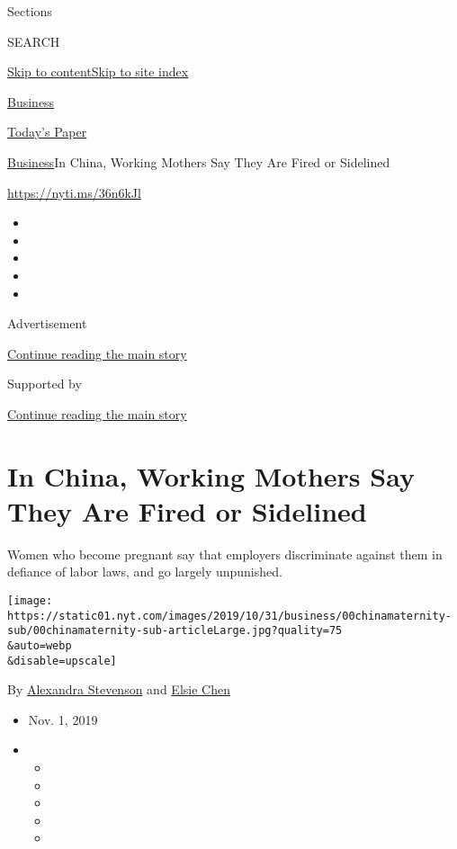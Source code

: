 Sections

SEARCH

\protect\hyperlink{site-content}{Skip to
content}\protect\hyperlink{site-index}{Skip to site index}

\href{https://www.nytimes.com/section/business}{Business}

\href{https://myaccount.nytimes.com/auth/login?response_type=cookie\&client_id=vi}{}

\href{https://www.nytimes.com/section/todayspaper}{Today's Paper}

\href{/section/business}{Business}\textbar{}In China, Working Mothers
Say They Are Fired or Sidelined

\url{https://nyti.ms/36n6kJl}

\begin{itemize}
\item
\item
\item
\item
\item
\end{itemize}

Advertisement

\protect\hyperlink{after-top}{Continue reading the main story}

Supported by

\protect\hyperlink{after-sponsor}{Continue reading the main story}

\hypertarget{in-china-working-mothers-say-they-are-fired-or-sidelined}{%
\section{In China, Working Mothers Say They Are Fired or
Sidelined}\label{in-china-working-mothers-say-they-are-fired-or-sidelined}}

Women who become pregnant say that employers discriminate against them
in defiance of labor laws, and go largely unpunished.

\texttt{[image: https://static01.nyt.com/images/2019/10/31/business/00chinamaternity-sub/00chinamaternity-sub-articleLarge.jpg?quality=75\\\&auto=webp\\\&disable=upscale]}

By \href{https://www.nytimes.com/by/alexandra-stevenson}{Alexandra
Stevenson} and \href{https://www.nytimes.com/by/elsie-chen}{Elsie Chen}

\begin{itemize}
\item
  Nov. 1, 2019
\item
  \begin{itemize}
  \item
  \item
  \item
  \item
  \item
  \end{itemize}
\end{itemize}

